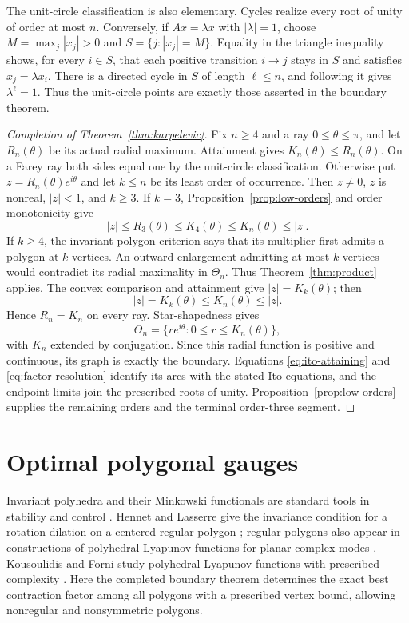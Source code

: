 \documentclass[11pt,a4paper]{article}
\theoremstyle{definition}
\theoremstyle{remark}
\numberwithin{equation}{section}
\begin{document}
The unit-circle classification is also elementary.
Cycles realize every root of unity of order at most $n$.
Conversely, if $Ax=\lambda x$ with $|\lambda|=1$, choose $M=\max_j|x_j|>0$ and $S=\{j:|x_j|=M\}$.
Equality in the triangle inequality shows, for every $i\in S$, that each positive transition $i\to j$ stays in $S$ and satisfies $x_j=\lambda x_i$.
There is a directed cycle in $S$ of length $\ell\le n$, and following it gives $\lambda^\ell=1$.
Thus the unit-circle points are exactly those asserted in the boundary theorem.

\begin{proof}[Completion of Theorem~\ref{thm:karpelevic}]
Fix $n\ge4$ and a ray $0\le\theta\le\pi$, and let $R_n(\theta)$ be its actual radial maximum.
Attainment gives $K_n(\theta)\le R_n(\theta)$.
On a Farey ray both sides equal one by the unit-circle classification.
Otherwise put $z=R_n(\theta)e^{i\theta}$ and let $k\le n$ be its least order of occurrence.
Then $z\ne0$, $z$ is nonreal, $|z|<1$, and $k\ge3$.
If $k=3$, Proposition~\ref{prop:low-orders} and order monotonicity give
\[
 |z|\le R_3(\theta)\le K_4(\theta)\le K_n(\theta)\le |z|.
\]
If $k\ge4$, the invariant-polygon criterion says that its multiplier first admits a polygon at $k$ vertices.
An outward enlargement admitting at most $k$ vertices would contradict its radial maximality in $\Theta_n$.
Thus Theorem~\ref{thm:product} applies.
The convex comparison and attainment give $|z|=K_k(\theta)$; then
\[
 |z|=K_k(\theta)\le K_n(\theta)\le |z|.
\]
Hence $R_n=K_n$ on every ray.
Star-shapedness gives
\[
 \Theta_n=\{re^{i\theta}:0\le r\le K_n(\theta)\},
\]
with $K_n$ extended by conjugation.
Since this radial function is positive and continuous, its graph is exactly the boundary.
Equations \eqref{eq:ito-attaining} and \eqref{eq:factor-resolution} identify its arcs with the stated Ito equations, and the endpoint limits join the prescribed roots of unity.
Proposition~\ref{prop:low-orders} supplies the remaining orders and the terminal order-three segment.
\end{proof}


\section{Optimal polygonal gauges}
\label{sec:gauges}

Invariant polyhedra and their Minkowski functionals are standard tools
in stability and control \cite{Bitsoris,FarinaBenvenuti,Blanchini}.
Hennet and Lasserre give the invariance condition for a rotation-dilation
on a centered regular polygon \cite[Lemma~2]{HennetLasserre}; regular
polygons also appear in constructions of polyhedral Lyapunov functions
for planar complex modes \cite{RossiColaneriShorten}. Kousoulidis and
Forni study polyhedral Lyapunov functions with prescribed complexity
\cite{KousoulidisForni}. Here the completed boundary theorem determines
the exact best contraction factor among all polygons with a prescribed
vertex bound, allowing nonregular and nonsymmetric polygons.
\end{document}
